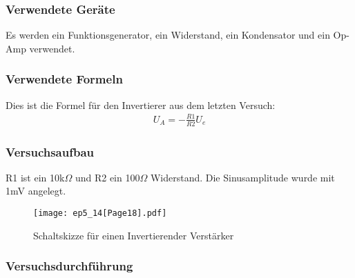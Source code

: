 \documentclass[12pt,a4paper]{article}
\begin{document}
\subsubsection{Verwendete Geräte}

Es werden ein Funktionsgenerator, ein Widerstand, ein Kondensator und ein Op-Amp verwendet.

\subsubsection{Verwendete Formeln}
Dies ist die Formel für den Invertierer aus dem letzten Versuch:
\begin{align}
U_A=-\frac{R1}{R2} U_e
\end{align}
\subsubsection{Versuchsaufbau}

R1 ist ein 10k$\Omega$ und R2 ein 100$\Omega$ Widerstand. Die Sinusamplitude wurde mit 1mV angelegt.

\begin{figure}[H] 
  \centering
    \texttt{[image: ep5\_14[Page18].pdf]}
  	\caption[Schaltskizze für einen Invertierender Verstärker]{Schaltskizze für einen Invertierender Verstärker\footnotemark}
  \label{fig:4_a_2}
\end{figure}

\subsubsection{Versuchsdurchführung}
\end{document}
